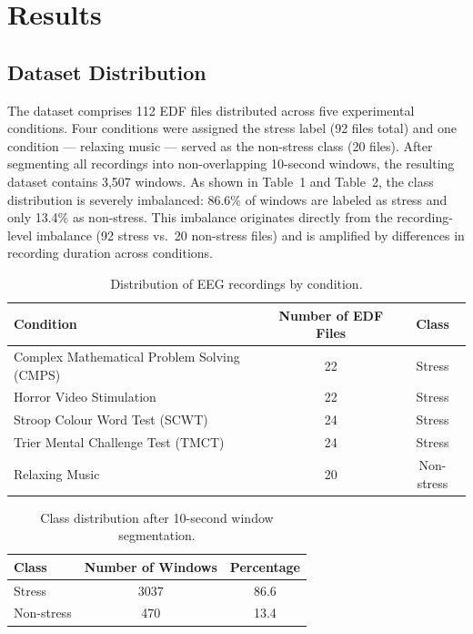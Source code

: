 \documentclass[12pt,a4paper]{article}
\begin{document}
	\section{Results}
	
	\subsection{Dataset Distribution}

	The dataset comprises 112 EDF files distributed across five experimental conditions. Four conditions were assigned the stress label (92 files total) and one condition — relaxing music — served as the non-stress class (20 files). After segmenting all recordings into non-overlapping 10-second windows, the resulting dataset contains 3,507 windows. As shown in Table~1 and Table~2, the class distribution is severely imbalanced: 86.6\% of windows are labeled as stress and only 13.4\% as non-stress. This imbalance originates directly from the recording-level imbalance (92 stress vs.\ 20 non-stress files) and is amplified by differences in recording duration across conditions.

	\begin{table}[H]
		\centering
		\caption{Distribution of EEG recordings by condition.}
		\begin{tabular}{lcc}
			\toprule
			\textbf{Condition} & \textbf{Number of EDF Files} & \textbf{Class} \\
			\midrule
			Complex Mathematical Problem Solving (CMPS) & 22 & Stress \\
			Horror Video Stimulation & 22 & Stress \\
			Stroop Colour Word Test (SCWT) & 24 & Stress \\
			Trier Mental Challenge Test (TMCT) & 24 & Stress \\
			Relaxing Music & 20 & Non-stress \\
			\bottomrule
		\end{tabular}
	\end{table}
	
	\begin{table}[H]
		\centering
		\caption{Class distribution after 10-second window segmentation.}
		\begin{tabular}{lcc}
			\toprule
			\textbf{Class} & \textbf{Number of Windows} & \textbf{Percentage} \\
			\midrule
			Stress & 3037 & 86.6 \\
			Non-stress & 470 & 13.4 \\
			\bottomrule
		\end{tabular}
	\end{table}
	
\end{document}
